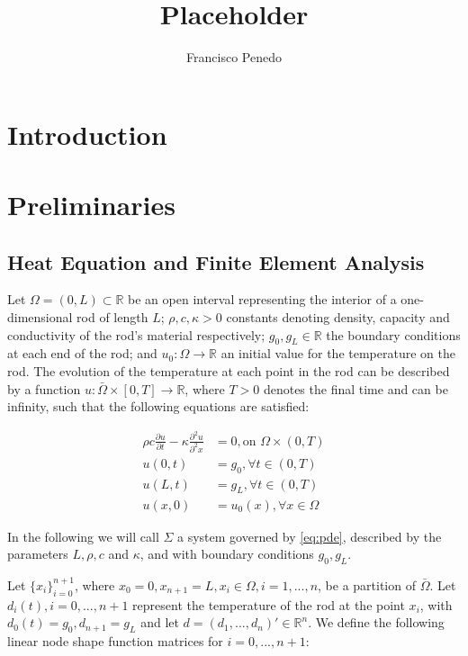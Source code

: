 \documentclass{article}
\title{Placeholder}
\author{Francisco Penedo}
\newcommand*{\R}{\mathbb{R}}
\begin{document}
\section{Introduction}
\label{sec:introduction}

\section{Preliminaries}
\label{sec:preliminaries}

\subsection{Heat Equation and Finite Element Analysis}
\label{sub:heat_equation_and_finite_element_analysis}

Let $\Omega = (0, L) \subset \R$ be an open interval representing the interior
of a one-dimensional rod of length $L$; $\rho, c, \kappa > 0$ 
constants denoting density, capacity and conductivity of the rod's material respectively;
$g_0, g_L \in \R$ the boundary conditions at each end of the rod; and $u_0 :
\Omega \rightarrow \R$ an initial value for the temperature on the rod. 
The evolution of the temperature at
each point in the rod can be described by a function $u : \bar \Omega \times [0,
T] \rightarrow \R$, where $T > 0$ denotes the final time and can be infinity, 
such that the following equations are satisfied:

\begin{equation}\label{eq:pde}
    \begin{aligned}
        \rho c \frac{\partial u}{\partial t} - \kappa \frac{\partial^2
        u}{\partial^2 x} &= 0, \text{on } \Omega \times (0, T) \\
        u(0, t) &= g_0, \forall t \in (0, T) \\
        u(L, t) &= g_L, \forall t \in (0, T) \\
        u(x, 0) &= u_0(x), \forall x \in \Omega
    \end{aligned}
\end{equation}

In the following we will call $\Sigma$ a system governed by \eqref{eq:pde},
described by the parameters $L, \rho, c$ and $\kappa$, and with boundary
conditions $g_0, g_L$.


Let $\{x_i\}_{i = 0}^{n +
1}$, where $x_0 = 0, x_{n+1} = L, x_i \in \Omega, i = 1,...,n$, be a partition of
$\bar\Omega$. Let $d_i(t), i = 0,...,n+1$ represent the
temperature of the rod at the point $x_i$, with $d_0(t) = g_0, d_{n+1} = g_L$ and let $d = (d_1, ..., d_n)' \in
\R^n$. We define the following linear node shape function matrices for $i =
0,...,n+1$:
\end{document}
